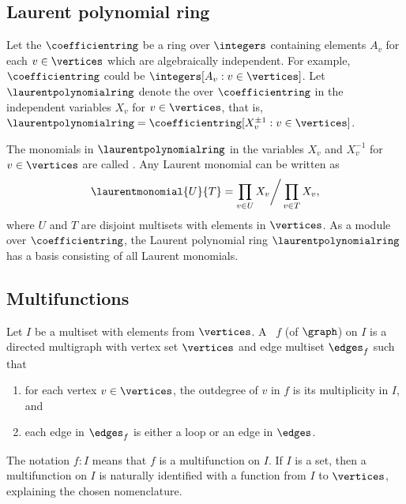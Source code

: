 \subsection{Laurent polynomial ring} \label{subsection:laurentpolynomialring}

Let the  \(\coefficientring\) be a ring over \(\integers\)
containing elements \(A_v\) for each \(v \in \vertices\) which are algebraically independent.
For example, \(\coefficientring\) could be
\(\integers[A_v : v \in \vertices]\).
Let \(\laurentpolynomialring\) denote the  over \(\coefficientring\)
in the independent variables \(X_v\) for \(v \in \vertices\), that is,
\( \laurentpolynomialring = \coefficientring[X_v^{\pm 1} : v \in \vertices]\).

The monomials in \(\laurentpolynomialring\) in the variables \(X_v\) and \(X_v^{-1}\) for \(v \in \vertices\) are called .
Any Laurent monomial can be written as
\begin{equation*}
    \laurentmonomial{U}{T} = \prod_{v \in U} X_v \bigg/ \prod_{v \in T} X_v,
\end{equation*}
where \(U\) and \(T\) are disjoint multisets with elements in \(\vertices\).
As a module over \(\coefficientring\), the Laurent polynomial ring \(\laurentpolynomialring\) has a basis consisting of all Laurent monomials.

\subsection{Multifunctions} \label{subsection:multifunctions}

Let \(I\) be a multiset with elements from \(\vertices\).
A ~\(f\) (of \(\graph\)) on \(I\) is a directed multigraph with vertex set \(\vertices\) and edge multiset \(\edges_f\) such that
\begin{enumerate}[label = (F\arabic*), ref = (F\arabic*), leftmargin = .6in]
    \item for each vertex \(v \in \vertices\), the outdegree of \(v\) in \(f\) is its multiplicity in \(I\), and
    \item each edge in \(\edges_f\) is either a loop or an edge in \(\edges\).
\end{enumerate}
The notation \(f:I\) means that \(f\) is a multifunction on \(I\).
If \(I\) is a set, then a multifunction on \(I\) is naturally identified with a function from \(I\) to \(\vertices\), explaining the chosen nomenclature. 

